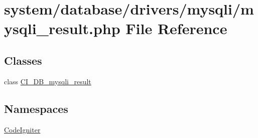 \hypertarget{mysqli__result_8php}{}\section{system/database/drivers/mysqli/mysqli\+\_\+result.php File Reference}
\label{mysqli__result_8php}
\subsection*{Classes}
\begin{DoxyCompactItemize}
\item 
class \mbox{\hyperlink{class_c_i___d_b__mysqli__result}{C\+I\+\_\+\+D\+B\+\_\+mysqli\+\_\+result}}
\end{DoxyCompactItemize}
\subsection*{Namespaces}
\begin{DoxyCompactItemize}
\item 
 \mbox{\hyperlink{namespace_code_igniter}{Code\+Igniter}}
\end{DoxyCompactItemize}
